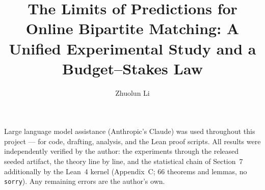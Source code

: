 \documentclass[manuscript,screen,review]{acmart}
\title{The Limits of Predictions for Online Bipartite Matching: A Unified
  Experimental Study and a Budget--Stakes Law}
\author{Zhuolun Li}   %
\affiliation{%
  \institution{University of Bristol}
  \city{Bristol}
  \country{United Kingdom}}
\begin{document}
\maketitle










\appendix


\begin{acks}
Large language model assistance (Anthropic's Claude) was used throughout this project ---
for code, drafting, analysis, and the Lean proof scripts. All results were independently
verified by the author: the experiments through the released seeded artifact, the theory
line by line, and the statistical chain of Section~7 additionally by the Lean~4 kernel
(Appendix~C; 66 theorems and lemmas, no \texttt{sorry}). Any remaining errors are the
author's own.
\end{acks}



\end{document}
